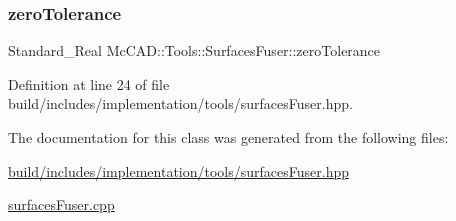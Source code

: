 \subsubsection{\texorpdfstring{zero\+Tolerance}{zeroTolerance}}
{\footnotesize\ttfamily Standard\+\_\+\+Real Mc\+C\+A\+D\+::\+Tools\+::\+Surfaces\+Fuser\+::zero\+Tolerance\hspace{0.3cm}{\ttfamily [private]}}



Definition at line 24 of file build/includes/implementation/tools/surfaces\+Fuser.\+hpp.



The documentation for this class was generated from the following files\+:\begin{DoxyCompactItemize}
\item 
\hyperlink{build_2includes_2implementation_2tools_2surfacesFuser_8hpp}{build/includes/implementation/tools/surfaces\+Fuser.\+hpp}\item 
\hyperlink{surfacesFuser_8cpp}{surfaces\+Fuser.\+cpp}\end{DoxyCompactItemize}
